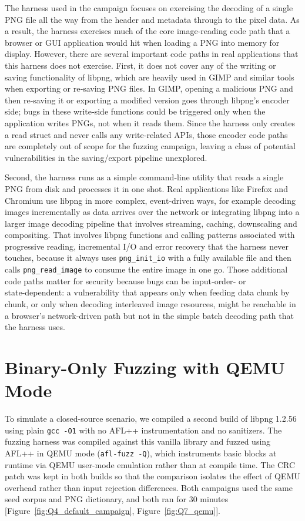 The harness used in the campaign focuses on exercising the decoding of a single PNG file all the way from the header and metadata through to the pixel data. As a result, the harness exercises much of the core image‑reading code path that a browser or GUI application would hit when loading a PNG into memory for display. However, there are several important code paths in real applications that this harness does not exercise. First, it does not cover any of the writing or saving functionality of libpng, which are heavily used in GIMP and similar tools when exporting or re‑saving PNG files. In GIMP, opening a malicious PNG and then re‑saving it or exporting a modified version goes through libpng’s encoder side; bugs in these write‑side functions could be triggered only when the application writes PNGs, not when it reads them. Since the harness only creates a read struct and never calls any write‑related APIs, those encoder code paths are completely out of scope for the fuzzing campaign, leaving a class of potential vulnerabilities in the saving/export pipeline unexplored.

Second, the harness runs as a simple command‑line utility that reads a single PNG from disk and processes it in one shot. Real applications like Firefox and Chromium use libpng in more complex, event‑driven ways, for example decoding images incrementally as data arrives over the network or integrating libpng into a larger image decoding pipeline that involves streaming, caching, downscaling and compositing. That involves libpng functions and calling patterns associated with progressive reading, incremental I/O and error recovery that the harness never touches, because it always uses \texttt{png\_init\_io} with a fully available file and then calls \texttt{png\_read\_image} to consume the entire image in one go. Those additional code paths matter for security because bugs can be input‑order‑ or state‑dependent: a vulnerability that appears only when feeding data chunk by chunk, or only when decoding interleaved image resources, might be reachable in a browser’s network‑driven path but not in the simple batch decoding path that the harness uses.
\section{Binary-Only Fuzzing with QEMU Mode}
To simulate a closed-source scenario, we compiled a second build of
libpng 1.2.56 using plain \texttt{gcc -O1} with no AFL++
instrumentation and no sanitizers. The fuzzing harness was compiled
against this vanilla library and fuzzed using AFL++ in QEMU mode
(\texttt{afl-fuzz -Q}), which instruments basic blocks at runtime via
QEMU user-mode emulation rather than at compile time. The CRC patch
was kept in both builds so that the comparison isolates the effect of
QEMU overhead rather than input rejection differences. Both campaigns
used the same seed corpus and PNG dictionary, and both ran for 30
minutes [Figure~\ref{fig:Q4_default_campaign}, Figure~\ref{fig:Q7_qemu}].

